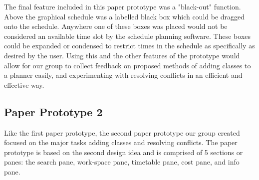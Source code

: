\documentclass{article}
\begin{document}
\newline
\newline
The final feature included in this paper prototype was a "black-out" function. Above the graphical schedule was a labelled black box which could be dragged onto the schedule. Anywhere one of these boxes was placed would not be considered an available time slot by the schedule planning software. These boxes could be expanded or condensed to restrict times in the schedule as specifically as desired by the user.  Using this and the other features of the prototype would allow for our group to collect feedback on proposed methods of adding classes to a planner easily, and experimenting with resolving conflicts in an efficient and effective way.



\subsection{Paper Prototype 2}%
Like the first paper prototype, the second paper prototype our group created focused on the major tasks adding classes and resolving conflicts. The paper prototype is based on the second design idea and is comprised of 5 sections or panes: the search pane, work-space pane, timetable pane, cost pane, and info pane. 
\end{document}
